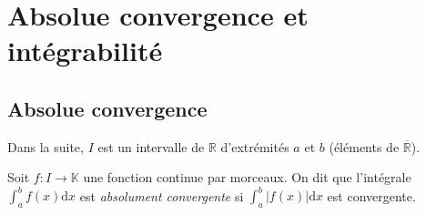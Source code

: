 \documentclass[french,11pt,twoside]{VcCours}
\newcommand{\dx}{\text{d}x}
\newcommand{\dt}{\text{d}t}
\begin{document}
%
%
%
%

\section{Absolue convergence et intégrabilité}

\subsection{Absolue convergence}

Dans la suite, $I$ est un intervalle de $\mathbb{R}$ d'extrémités $a$ et $b$ (éléments de $\overline{\mathbb{R}}$).

\begin{Definition}{} Soit $f : I \rightarrow \mathbb{K}$ une fonction continue par morceaux. On dit que l'intégrale $\int_{a}^b f(x) \dx$ est \emph{absolument convergente} si $\int_{a}^b \vert f(x) \vert \dx$ est convergente.
\end{Definition}
\end{document}
